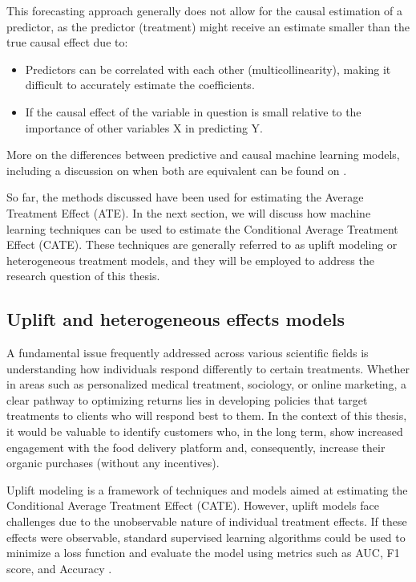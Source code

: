 This forecasting approach generally does not allow for the causal estimation of a predictor, as the predictor (treatment) might receive an estimate smaller than the true causal effect due to:

\begin{itemize}
  \item  Predictors can be correlated with each other (multicollinearity), making it difficult to accurately estimate the coefficients.
  \item  If the causal effect of the variable in question is small relative to the importance of other variables X in predicting Y.
\end{itemize}

More on the differences between predictive and causal machine learning models, including a discussion on when both are equivalent can be found on \textcite{fernandez-loria_causal_nodate}. 

So far, the methods discussed have been used for estimating the Average Treatment Effect (\gls{ATE}). In the next section, we will discuss how machine learning techniques can be used to estimate the Conditional Average Treatment Effect (CATE). 
These techniques are generally referred to as uplift modeling or heterogeneous treatment models, and they will be employed to address the research question of this thesis.

\subsection{Uplift and heterogeneous effects models}
\label{sub:uplift_models}

A fundamental issue frequently addressed across various scientific fields is understanding how individuals respond differently to certain treatments. Whether in areas such as personalized medical 
treatment, sociology, or online marketing, a clear pathway to optimizing returns lies in developing policies that target treatments to clients who will respond best to them. In the context of this thesis, 
it would be valuable to identify customers who, in the long term, show increased engagement with the food delivery platform and, consequently, increase their organic purchases (without any incentives).

Uplift modeling is a framework of techniques and models aimed at estimating the Conditional Average Treatment Effect (CATE). However, uplift models face challenges due to the unobservable nature of individual 
treatment effects. If these effects were observable, standard supervised learning algorithms could be used to minimize a loss function and evaluate the model using metrics such as AUC, F1 score, and Accuracy \parencite{gutierrez_causal_nodate}.

